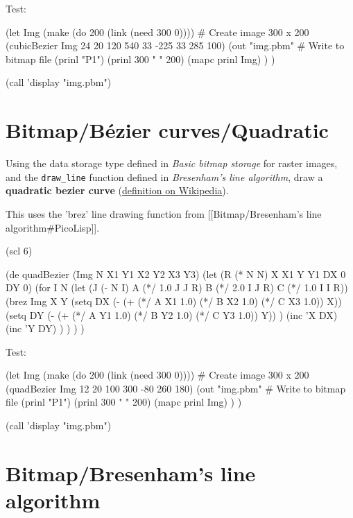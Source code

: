 \begin{wideverbatim}

Test:

(let Img (make (do 200 (link (need 300 0))))       # Create image 300 x 200
   (cubicBezier Img 24 20 120 540 33 -225 33 285 100)
   (out "img.pbm"                                  # Write to bitmap file
      (prinl "P1")
      (prinl 300 " " 200)
      (mapc prinl Img) ) )

(call 'display "img.pbm")

\end{wideverbatim}

\pagebreak{}
\section*{Bitmap/B\'{e}zier curves/Quadratic}

Using the data storage type defined in \emph{Basic bitmap storage}
for raster images, and the \texttt{draw\_line} function defined in
\emph{Bresenham's line algorithm}, draw a \textbf{quadratic bezier
  curve} 
(\href{http://en.wikipedia.org/wiki/Bezier\_curves\#Quadratic\_B.C3.A9zier\_curves}{definition
on Wikipedia}).

\begin{wideverbatim}

This uses the 'brez' line drawing function from
[[Bitmap/Bresenham's line algorithm#PicoLisp]].

(scl 6)

(de quadBezier (Img N X1 Y1 X2 Y2 X3 Y3)
   (let (R (* N N)  X X1  Y Y1  DX 0  DY 0)
      (for I N
         (let (J (- N I)  A (*/ 1.0 J J R)  B (*/ 2.0 I J R)  C (*/ 1.0 I I R))
            (brez Img X Y
               (setq DX (- (+ (*/ A X1 1.0) (*/ B X2 1.0) (*/ C X3 1.0)) X))
               (setq DY (- (+ (*/ A Y1 1.0) (*/ B Y2 1.0) (*/ C Y3 1.0)) Y)) )
            (inc 'X DX)
            (inc 'Y DY) ) ) ) )

Test:

(let Img (make (do 200 (link (need 300 0))))       # Create image 300 x 200
   (quadBezier Img 12 20 100 300 -80 260 180)
   (out "img.pbm"                                  # Write to bitmap file
      (prinl "P1")
      (prinl 300 " " 200)
      (mapc prinl Img) ) )

(call 'display "img.pbm")

\end{wideverbatim}

\pagebreak{}
\section*{Bitmap/Bresenham's line algorithm}

